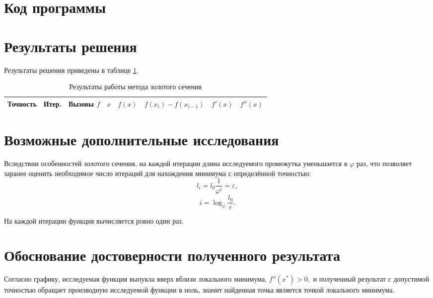 \documentclass[10pt,a4paper,titlepage]{article}
\begin{document}
\section{Код программы}
\lstset{language=Octave, caption=Решение задачи поиска минимума унимодальной функции,%
label=main-source-code, basicstyle=\footnotesize,%
numbers=left, numberstyle=\footnotesize, numbersep=5pt, frame=single, breaklines=true, breakatwhitespace=false,%
inputencoding=utf8x}


\section{Результаты решения}
Результаты решения приведены в таблице \ref{result-table}.

\begin{table}[H]
\caption{Результаты работы метода золотого сечения}
\label{result-table}
\begin{center}
\begin{tabular}{|c|c|c|c|c|c|c|c|}
\hline
{\small Точность} & {\small Итер.} & {\small Вызовы $f$} & $x$ & $f(x)$ & $f(x_i) - f(x_{i-1})$ & $f'(x)$ & $f''(x)$ \\
\hline

\hline
\end{tabular}
\end{center}
\end{table}


\section{Возможные дополнительные исследования}
Вследствии особенностей золотого сечения, на каждой итерации длина исследуемого промежутка уменьшается в $\varphi$ раз, 
что позволяет заранее оценить необходимое число итераций для нахождения минимума с определённой точностью:
$$
  l_i = l_0 \frac{1}{\varphi^i} = \varepsilon,
$$
$$
   i = \log_{\varphi} \frac{l_0}{\varepsilon}.
$$

На каждой итерации функция вычисляется ровно один раз.

\section{Обоснование достоверности полученного результата}
Согласно графику, исследуемая функция выпукла вверх вблизи локального минимума, 
$f''(x^*) > 0,$
и полученный результат с допустимой точностью обращает производную исследуемой функции в ноль, 
значит найденная точка является точкой локального минимума.
\end{document}
